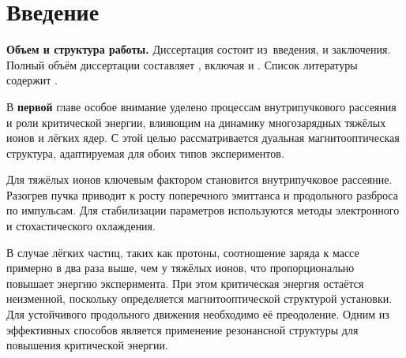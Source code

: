 \chapter*{Введение}                         %

\newcommand{\progress}{}
\newcommand{\aim}{{\textbf\aimTXT}}
\newcommand{\tasks}{\textbf{\tasksTXT}}
\newcommand{\novelty}{\textbf{\noveltyTXT}}
\newcommand{\influence}{\textbf{\influenceTXT}}
\newcommand{\methods}{\textbf{\methodsTXT}}
\newcommand{\defpositions}{\textbf{\defpositionsTXT}}
\newcommand{\reliability}{\textbf{\reliabilityTXT}}
\newcommand{\probation}{\textbf{\probationTXT}}
\newcommand{\contribution}{\textbf{\contributionTXT}}
\newcommand{\publications}{\textbf{\publicationsTXT}}


\textbf{Объем и структура работы.} Диссертация состоит из~введения,
и заключения.
%
Полный объём диссертации составляет
, включая
 и
.
Список литературы содержит
.

В \textbf{первой} главе особое внимание уделено процессам внутрипучкового рассеяния и роли критической энергии, влияющим на динамику многозарядных тяжёлых ионов и лёгких ядер. С этой целью рассматривается дуальная магнитооптическая структура, адаптируемая для обоих типов экспериментов.

\par Для тяжёлых ионов ключевым фактором становится внутрипучковое рассеяние. Разогрев пучка приводит к росту поперечного эмиттанса и продольного разброса по импульсам. Для стабилизации параметров используются методы электронного и стохастического охлаждения.

\par В случае лёгких частиц, таких как протоны, соотношение заряда к массе примерно в два раза выше, чем у тяжёлых ионов, что пропорционально повышает энергию эксперимента. При этом критическая энергия остаётся неизменной, поскольку определяется магнитооптической структурой установки. Для устойчивого продольного движения необходимо её преодоление. Одним из эффективных способов является применение резонансной структуры для повышения критической энергии.

